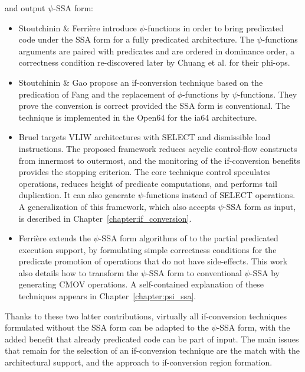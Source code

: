 and output $\psi$-SSA form: \begin{itemize}

\item Stoutchinin \& Ferri\`ere \cite{Stoutchinin:2001:MICRO} introduce
$\psi$-functions in order to bring predicated code under the SSA form for a
fully predicated architecture. The $\psi$-functions arguments are paired with
predicates and are ordered in dominance order, a correctness condition
re-discovered later by Chuang et al. \cite{Chuang:2003:CGO} for their phi-ops.

\item Stoutchinin \& Gao \cite{Stoutchinin:2004:EuroPar} propose an
if-conversion technique based on the predication of Fang \cite{Fang:1996:LCPC}
and the replacement of $\phi$-functions by $\psi$-functions. They prove the
conversion is correct provided the SSA form is conventional. The technique is
implemented in the Open64 for the ia64 architecture.

\item Bruel \cite{Bru06} targets VLIW architectures with SELECT and
dismissible load instructions. The proposed framework reduces acyclic
control-flow constructs from innermost to outermost, and the monitoring of the
if-conversion benefits provides the stopping criterion. The core technique
control speculates operations, reduces height of predicate computations, and
performs tail duplication. It can also generate $\psi$-functions instead of
SELECT operations. A generalization of this framework, which also accepts
$\psi$-SSA form as input, is described in Chapter~\ref{chapter:if_conversion}.

\item Ferri\`ere \cite{Ferriere:2007:SCOPES} extends the $\psi$-SSA form
algorithms of \cite{Stoutchinin:2001:MICRO} to the partial predicated execution
support, by formulating simple correctness conditions for the predicate
promotion of operations that do not have side-effects. This work also details
how to transform the $\psi$-SSA form to conventional $\psi$-SSA by generating
CMOV operations. A self-contained explanation of these techniques appears in
Chapter~\ref{chapter:psi_ssa}.

\end{itemize}

Thanks to these two latter contributions, virtually all if-conversion techniques
formulated without the SSA form can be adapted to the $\psi$-SSA form, with the
added benefit that already predicated code can be part of input. The main issues
that remain for the selection of an if-conversion technique are the match with
the architectural support, and the approach to if-conversion region formation.

